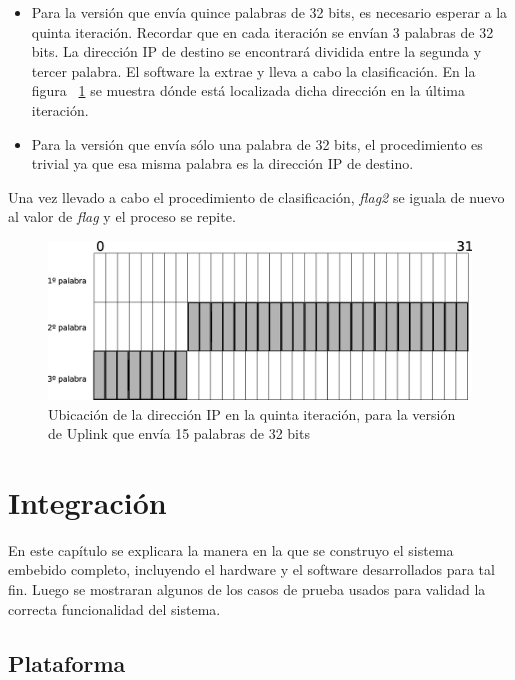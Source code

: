 \begin{itemize}
	\item Para la versión que envía quince palabras de 32 bits, es necesario esperar a la quinta iteración. Recordar que en cada iteración se envían 3 palabras de 32 bits. La dirección IP de destino se encontrará dividida entre la segunda y tercer palabra. El software la extrae y lleva a cabo la clasificación. En la figura ~\ref{fig:ip15pal} se muestra dónde está localizada dicha dirección en la última iteración.
	\item Para la versión que envía sólo una palabra de 32 bits, el procedimiento es trivial ya que esa misma palabra es la dirección IP de destino.
\end{itemize}


Una vez llevado a cabo el procedimiento de clasificación, \textit{flag2} se iguala de nuevo al valor de \textit{flag }y el proceso se repite.


\begin{figure}[H]
  \centering
	\includegraphics[scale=0.30]{4-implementacion/graf/ip15pal.eps}
  \caption{Ubicación de la dirección IP en la quinta iteración, para la versión de Uplink que envía 15 palabras de 32 bits}
  \label{fig:ip15pal}
\end{figure}

\chapter{Integración}

En este capítulo se explicara la manera en la que se construyo el sistema embebido completo, incluyendo el hardware y el software desarrollados para tal fin. Luego se mostraran algunos de los casos de prueba usados para validad la correcta funcionalidad del sistema.

\section{Plataforma}

